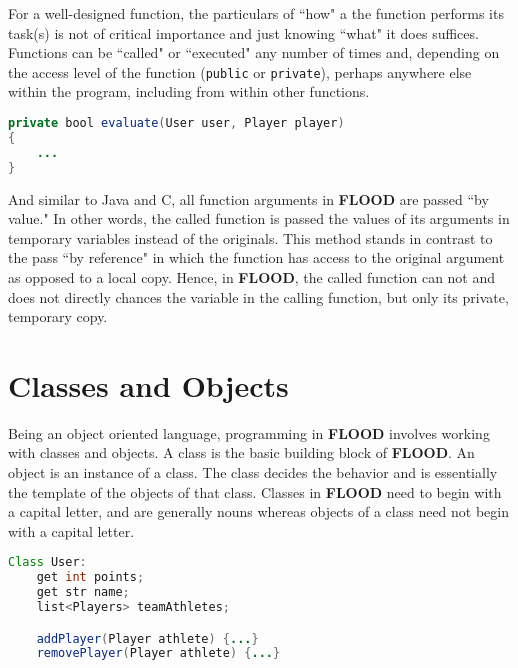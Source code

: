 \documentclass[12pt]{report}
\begin{document}
For a well-designed function, the particulars of ``how" a the function performs its task(s) is not of critical importance and just knowing ``what" it does suffices. Functions can be ``called" or ``executed" any number of times and, depending on the access level of the function (\texttt{public} or \texttt{private}), perhaps anywhere else within the program, including from within other functions.

\begin{singlespace}
\begin{lstlisting}[language=Java,label=some-code,caption=Syntax of a FLOOD function]
private bool evaluate(User user, Player player)
{
	...
}
\end{lstlisting}
\end{singlespace}

And similar to Java and C, all function arguments in \textbf{FLOOD} are passed ``by value." In other words, the called function is passed the values of its arguments in temporary variables instead of the originals. This method stands in contrast to the pass ``by reference" in which the function has access to the original argument as opposed to a local copy. Hence, in \textbf{FLOOD}, the called function can not and does not directly chances the variable in the calling function, but only its private, temporary copy.

\section{Classes and Objects}

Being an object oriented language, programming in \textbf{FLOOD} involves working with classes and objects. A class is the basic building block of \textbf{FLOOD}. An object is an instance of a class. The class decides the behavior and is essentially the template of the objects of that class. Classes in \textbf{FLOOD} need to begin with a capital letter, and are generally nouns whereas objects of a class need not begin with a capital letter. 

\begin{singlespace}
\begin{lstlisting}[language=Java,label=some-code,caption=Typical definition of a class in FLOOD]
Class User:
	get int points;
	get str name;
	list<Players> teamAthletes;

	addPlayer(Player athlete) {...}
	removePlayer(Player athlete) {...}
\end{lstlisting}
\end{singlespace}
\end{document}

